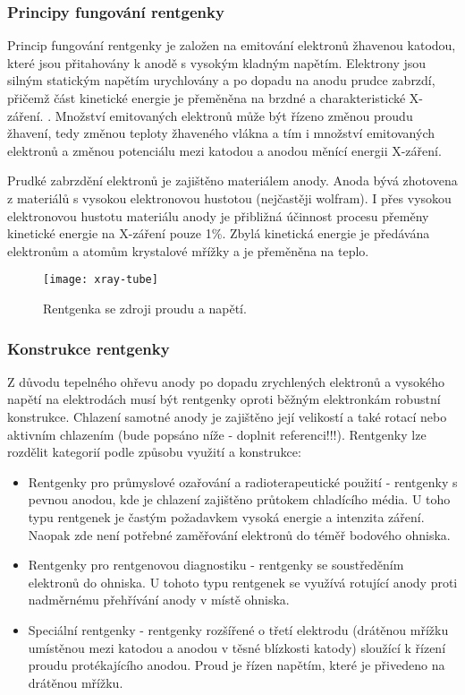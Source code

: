 \subsubsection{Principy fungování rentgenky}
Princip fungování rentgenky je založen na emitování elektronů žhavenou katodou, které jsou přitahovány k anodě s vysokým kladným napětím. Elektrony jsou silným statickým napětím urychlovány a po dopadu na anodu prudce zabrzdí, přičemž část kinetické energie je přeměněna na brzdné a charakteristické X-záření. \cite{AstroNuklFyzika-JadRadMetody}. Množství emitovaných elektronů může být řízeno změnou proudu žhavení, tedy změnou teploty žhaveného vlákna a tím i množství emitovaných elektronů a změnou potenciálu mezi katodou a anodou měnící energii X-záření. \cite[str.~93]{Diagnostic-Radiology-Physics}

Prudké zabrzdění elektronů je zajištěno materiálem anody. Anoda bývá zhotovena z materiálů s vysokou elektronovou hustotou (nejčastěji wolfram). I přes vysokou elektronovou hustotu materiálu anody je přibližná účinnost procesu přeměny kinetické energie na X-záření pouze 1\%. Zbylá kinetická energie je předávána elektronům a atomům krystalové mřížky a je přeměněna na teplo. \cite[kap. 3.2]{AstroNuklFyzika-JadRadMetody}

\begin{figure}[bh]
\texttt{[image: xray-tube]}
\caption{Rentgenka se zdroji proudu a napětí. \cite[str. 93]{Diagnostic-Radiology-Physics}}
\label{fig:x-ray-scene}
\centering
\end{figure}

\subsubsection{Konstrukce rentgenky}
Z důvodu tepelného ohřevu anody po dopadu zrychlených elektronů a vysokého napětí na elektrodách musí být rentgenky oproti běžným elektronkám robustní konstrukce. Chlazení samotné anody je zajištěno její velikostí a také rotací  nebo aktivním chlazením (bude popsáno níže - doplnit referenci!!!). Rentgenky lze rozdělit kategorií podle způsobu využití a konstrukce:
\begin{itemize}
\item Rentgenky pro průmyslové ozařování a radioterapeutické použití - rentgenky s pevnou anodou, kde je chlazení zajištěno průtokem chladícího média. U toho typu rentgenek je častým požadavkem vysoká energie a intenzita záření. Naopak zde není potřebné zaměřování elektronů do téměř bodového ohniska. 
\item Rentgenky pro rentgenovou diagnostiku - rentgenky se soustředěním elektronů do ohniska. U tohoto typu rentgenek se využívá rotující anody proti nadměrnému přehřívání anody v místě ohniska.
\item Speciální rentgenky - rentgenky rozšířené o třetí elektrodu (drátěnou mřížku umístěnou mezi katodou a anodou v těsné blízkosti katody) sloužící k řízení proudu protékajícího anodou. Proud je řízen napětím, které je přivedeno na drátěnou mřížku.
\end{itemize}


